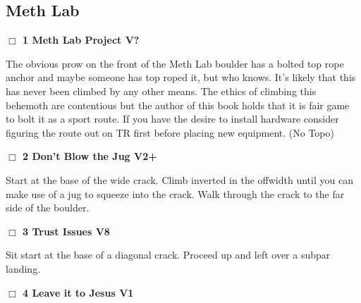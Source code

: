 	\begin{multicols}{2}


\needspace{10em}
\subsection*{Meth Lab}\label{bf:Meth Lab}




\needspace{2em}
\label{rt:Meth Lab Project}
\colorbox{black!20}{
\parbox{0.95\linewidth}{
\hspace{-1ex}\textbf{$\Box$
1 Meth Lab Project V?  \warn\warn\warn
}}}
\begin{adjustwidth}{1.3em}{}			

The obvious prow on the front of the Meth Lab boulder has a bolted top rope anchor and maybe someone has top roped it, but who knows. It's likely that this has never been climbed by any other means. The ethics of climbing this behemoth are contentious but the author of this book holds that it is fair game to bolt it as a sport route. If you have the desire to install hardware consider figuring the route out on TR first before placing new equipment.
  (No Topo)
\end{adjustwidth}




\needspace{2em}
\label{rt:Don't Blow the Jug}
\colorbox{green!20}{
\parbox{0.95\linewidth}{
\hspace{-1ex}\textbf{$\Box$
2 Don't Blow the Jug V2+  \warn
}}}
\begin{adjustwidth}{1.3em}{}			

Start at the base of the wide crack. Climb inverted in the offwidth until you can make use of a jug to squeeze into the crack. Walk through the crack to the far side of the boulder.
\end{adjustwidth}




\needspace{2em}
\label{rt:Trust Issues}
\colorbox{Goldenrod!20}{
\parbox{0.95\linewidth}{
\hspace{-1ex}\textbf{$\Box$
3 Trust Issues V8  \warn\warn
}}}
\begin{adjustwidth}{1.3em}{}			

Sit start at the base of a diagonal crack. Proceed up and left over a subpar landing.
\end{adjustwidth}




\needspace{2em}
\label{rt:Leave it to Jesus}
\colorbox{green!20}{
\parbox{0.95\linewidth}{
\hspace{-1ex}\textbf{$\Box$
4 Leave it to Jesus V1  
}}}
\begin{adjustwidth}{1.3em}{}			


\end{adjustwidth}
\end{multicols}
